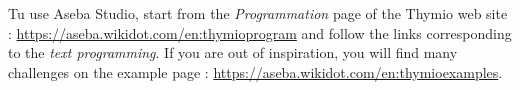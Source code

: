 Tu use Aseba Studio, start from the \emph{Programmation} page of the Thymio web site : \url{https://aseba.wikidot.com/en:thymioprogram} and follow the links corresponding to the \emph{text programming}.
If you are out of inspiration, you will find many challenges on the example page :  \url{https://aseba.wikidot.com/en:thymioexamples}.

\vspace{4em}


